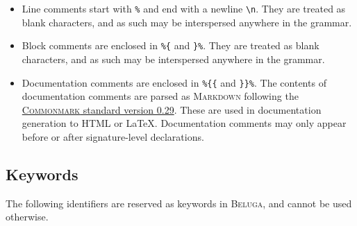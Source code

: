\documentclass[11pt]{article}
\newcommand{\Beluga}{\textsc{Beluga}\xspace}
\begin{document}
\begin{itemize}
\item
Line comments start with \texttt{\%} and end with a newline \texttt{\textbackslash n}.
They are treated as blank characters, and as such may be interspersed anywhere in the grammar.
\item
Block comments are enclosed in \texttt{\%\{} and \texttt{\}\%}.
They are treated as blank characters, and as such may be interspersed anywhere in the grammar.
\item
Documentation comments are enclosed in \texttt{\%\{\{} and \texttt{\}\}\%}.
The contents of documentation comments are parsed as \textsc{Markdown} following the \href{https://spec.commonmark.org/0.29}{\textsc{Commonmark} standard version 0.29}.
These are used in documentation generation to \textsc{HTML} or \LaTeX.
Documentation comments may only appear before or after signature-level declarations.
\end{itemize}

\subsection{Keywords}

The following identifiers are reserved as keywords in \Beluga, and cannot be used otherwise.
\end{document}
